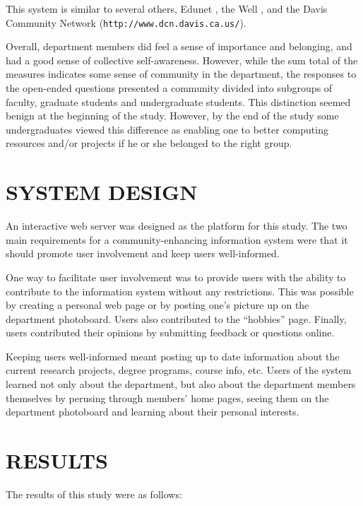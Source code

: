 This system is similar to several others, Edunet \cite{Wolpert91}, the Well
\cite{Rheingold93}, and the Davis Community Network 
\newline ({\tt http://www.dcn.davis.ca.us/}).

Overall, department members did feel a sense of importance and belonging, and
had a good sense of collective self-awareness.  However, while the sum total of
the measures indicates some sense of community in the department, the responses
to the open-ended questions presented a community divided into subgroups of
faculty, graduate students and undergraduate students.  This distinction seemed
benign at the beginning of the study.  However, by the end of the study some
undergraduates viewed this difference as enabling one to better computing
resources and/or projects if he or she belonged to the right group.

\section{SYSTEM DESIGN}
An interactive web server was designed as the platform for this study.  The two
main requirements for a community-enhancing information system were that it
should promote user involvement and keep users well-informed.

One way to facilitate user involvement was to provide users with the ability to
contribute to the information system without any restrictions.  This was
possible by creating a personal web page or by posting one's picture up on the
department photoboard.  Users also contributed to the ``hobbies'' page.
Finally, users contributed their opinions by submitting feedback or questions
online.

Keeping users well-informed meant posting up to date information about the
current research projects, degree programs, course info, etc.  Users of the
system learned not only about the department, but also about the department
members themselves by perusing through members' home pages, seeing them on the
department photoboard and learning about their personal interests.

\section{RESULTS}
The results of this study were as follows:

